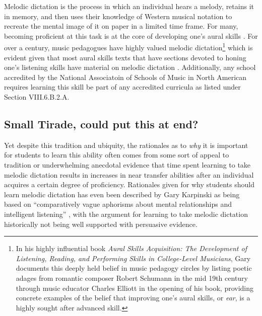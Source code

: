 \documentclass[]{book}
\let\rmarkdownfootnote\footnote%
\def\footnote{\protect\rmarkdownfootnote}
\theoremstyle{definition}
\theoremstyle{definition}
\theoremstyle{definition}
\theoremstyle{remark}
\begin{document}
Melodic dictation is the process in which an individual hears a melody,
retains it in memory, and then uses their knowledge of Western musical
notation to recreate the mental image of it on paper in a limited time
frame. For many, becoming proficient at this task is at the core of
developing one's aural skills \citep{karpinskiModelMusicPerception1990}.
For over a century, music pedagogues have highly valued melodic
dictation\footnote{In his highly influential book \emph{Aural Skills
  Acquisition: The Development of Listening, Reading, and Performing
  Skills in College-Level Musicians}, Gary
  \citet{karpinskiAuralSkillsAcquisition2000} documents this deeply held
  belief in music pedagogy circles by listing poetic adages from
  romantic composer Robert Schumann in the mid 19th century through
  music educator Charles Elliott in the opening of his book, providing
  concrete examples of the belief that improving one's aural skills, or
  \emph{ear}, is a highly sought after advanced skill. } which is
evident given that most aural skills texts that have sections devoted to
honing one's listening skills have material on melodic dictation
\citep{karpinskiAuralSkillsAcquisition2000}. Additionally, any school
accredited by the National Associatoin of Schools of Music in North
American requires learning this skill be part of any accredited
curricula as listed under Section VIII.6.B.2.A.

\hypertarget{small-tirade-could-put-this-at-end}{%
\subsection{Small Tirade, could put this at
end?}\label{small-tirade-could-put-this-at-end}}

Yet despite this tradition and ubiquity, the rationales as to \emph{why}
it is important for students to learn this ability often comes from some
sort of appeal to tradition or underwhelming anecdotal evidence that
time spent learning to take melodic dictation results in increases in
near transfer abilities after an individual acquires a certain degree of
proficiency. Rationales given for why students should learn melodic
dictation has even been described by Gary Karpinski as being based on
``comparatively vague aphorisms about mental relationships and
intelligent listening''
\citep[p.192]{karpinskiModelMusicPerception1990}, with the argument for
learning to take melodic dictation historically not being well supported
with persuasive evidence.
\end{document}
